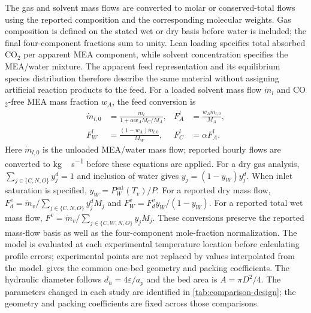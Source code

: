 The gas and solvent mass flows are converted to molar or conserved-total flows using the reported composition and the corresponding molecular weights.
Gas composition is defined on the stated wet or dry basis before water is included; the final four-component fractions sum to unity.
Lean loading specifies total absorbed CO$_2$ per apparent MEA component, while solvent concentration specifies the MEA/water mixture.
The apparent feed representation and its equilibrium species distribution therefore describe the same material without assigning artificial reaction products to the feed.
For a loaded solvent mass flow $\dot m_l$ and CO$_2$-free MEA mass fraction $w_A$, the feed conversion is
\begin{align}
\dot m_{l,0}&=\frac{\dot m_l}{1+\alpha w_A M_C/M_A},&
F_A^l&=\frac{w_A\dot m_{l,0}}{M_A},\\
F_W^l&=\frac{(1-w_A)\dot m_{l,0}}{M_W},&
F_C^l&=\alpha F_A^l.
\label{eq:liquid-feed-conversion}
\end{align}
Here $\dot m_{l,0}$ is the unloaded MEA/water mass flow; reported hourly flows are converted to \unit{kg\,s^{-1}} before these equations are applied.
For a dry gas analysis, $\sum_{j\in\{C,N,O\}}y_j^d=1$ and inclusion of water gives $y_j=(1-y_W)y_j^d$.
When inlet saturation is specified, $y_W=P_W^{\mathrm{sat}}(T_v)/P$.
For a reported dry mass flow, $F_d^v=\dot m_v/\sum_{j\in\{C,N,O\}}y_j^dM_j$ and $F_W^v=F_d^v y_W/(1-y_W)$.
For a reported total wet mass flow, $F^v=\dot m_v/\sum_{j\in\{C,W,N,O\}}y_jM_j$.
These conversions preserve the reported mass-flow basis as well as the four-component mole-fraction normalization.
The model is evaluated at each experimental temperature location before calculating profile errors; experimental points are not replaced by values interpolated from the model.
 gives the common one-bed geometry and packing coefficients.
The hydraulic diameter follows $d_h=4\varepsilon/a_p$ and the bed area is $A=\pi D^2/4$.
The parameters changed in each study are identified in \cref{tab:comparison-design}; the geometry and packing coefficients are fixed across those comparisons.

